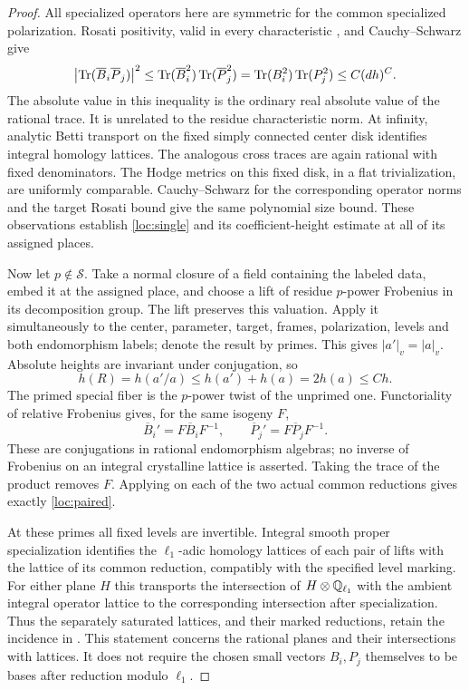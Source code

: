 \begin{proof}
All specialized operators here are symmetric for the common
specialized polarization.  Rosati positivity, valid in every
characteristic \cite[Theorem~17.3]{MilneAV}, and Cauchy--Schwarz give
\begin{equation}\label{loc:trace-size}
 \left|\operatorname{Tr}(\overline B_i\overline P_j)\right|^2
 \leq\operatorname{Tr}(\overline B_i^2)\operatorname{Tr}(\overline P_j^2)
 =\operatorname{Tr}(B_i^2)\operatorname{Tr}(P_j^2)\leq C(dh)^C.
\end{equation}
The absolute value in this inequality is the ordinary real absolute
value of the rational trace.  It is unrelated to the residue
characteristic norm.  At infinity, analytic Betti transport on the
fixed simply connected center disk identifies integral homology
lattices.  The analogous cross traces are again rational with fixed
denominators.  The Hodge metrics on this fixed disk, in a flat
trivialization, are uniformly comparable.  Cauchy--Schwarz for the
corresponding operator norms and the target Rosati bound give the
same polynomial size bound.  These observations establish
\eqref{loc:single} and its coefficient-height estimate at all of its
assigned places.

Now let $p\notin\mathcal S$.  Take a normal closure of a field
containing the labeled data, embed it at the assigned place, and choose
a lift of residue $p$-power Frobenius in its decomposition group.
The lift preserves this valuation.  Apply it simultaneously to the
center, parameter, target, frames, polarization, levels and both
endomorphism labels; denote the result by primes.  This gives
$|a'|_v=|a|_v$.  Absolute heights are invariant under conjugation, so
\[
 h(R)=h(a'/a)\leq h(a')+h(a)=2h(a)\leq Ch.
\]
The primed special fiber is the $p$-power twist of the unprimed one.
Functoriality of relative Frobenius gives, for the same isogeny $F$,
\[
 \overline B_i'=F\overline B_iF^{-1},\qquad
 \overline P_j'=F\overline P_jF^{-1}.
\]
These are conjugations in rational endomorphism algebras; no inverse
of Frobenius on an integral crystalline lattice is asserted.  Taking
the trace of the product removes $F$.  Applying
 on each of the two actual common reductions
gives exactly \eqref{loc:paired}.

At these primes all fixed levels are invertible.  Integral smooth
proper specialization identifies the $\ell_1$-adic homology lattices
of each pair of lifts with the lattice of its common reduction,
compatibly with the specified level marking.  For either plane $H$
this transports the intersection of $H\otimes\mathbb Q_{\ell_1}$ with the
ambient integral operator lattice to the corresponding intersection
after specialization.  Thus the separately saturated lattices, and
their marked reductions, retain the incidence in
.  This statement concerns the rational planes
and their intersections with lattices.  It does not require the
chosen small vectors $B_i,P_j$ themselves to be bases after reduction
modulo $\ell_1$.


\end{proof}
